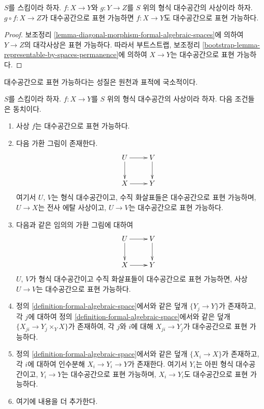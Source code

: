 \begin{lemma}
\label{lemma-permanence-representable}
$S$를 스킴이라 하자. $f : X \to Y$와 $g : Y \to Z$를 $S$ 위의
형식 대수공간의 사상이라 하자. $g \circ f : X \to Z$가 대수공간으로
표현 가능하면 $f : X \to Y$도 대수공간으로 표현 가능하다.
\end{lemma}

\begin{proof}
보조정리 \ref{lemma-diagonal-morphism-formal-algebraic-spaces}에 의하여
$Y \to Z$의 대각사상은 표현 가능하다. 따라서 부트스트랩, 보조정리
\ref{bootstrap-lemma-representable-by-spaces-permanence}에 의하여
$X \to Y$는 대수공간으로 표현 가능하다.
\end{proof}

\noindent
대수공간으로 표현 가능하다는 성질은 원천과 표적에 국소적이다.

\begin{lemma}
\label{lemma-representable-by-algebraic-spaces-local}
$S$를 스킴이라 하자. $f : X \to Y$를 $S$ 위의 형식 대수공간의
사상이라 하자. 다음 조건들은 동치이다.
\begin{enumerate}
\item 사상 $f$는 대수공간으로 표현 가능하다.
\item 다음 가환 그림이 존재한다.
$$
\xymatrix{
U \ar[d] \ar[r] & V \ar[d] \\
X \ar[r] & Y
}
$$
여기서 $U$, $V$는 형식 대수공간이고, 수직 화살표들은 대수공간으로
표현 가능하며, $U \to X$는 전사 에탈 사상이고, $U \to V$는
대수공간으로 표현 가능하다.
\item 다음과 같은 임의의 가환 그림에 대하여
$$
\xymatrix{
U \ar[d] \ar[r] & V \ar[d] \\
X \ar[r] & Y
}
$$
$U$, $V$가 형식 대수공간이고 수직 화살표들이 대수공간으로 표현
가능하면, 사상 $U \to V$는 대수공간으로 표현 가능하다.
\item 정의 \ref{definition-formal-algebraic-space}에서와 같은 덮개
$\{Y_j \to Y\}$가 존재하고, 각 $j$에 대하여 정의
\ref{definition-formal-algebraic-space}에서와 같은 덮개
$\{X_{ji} \to Y_j \times_Y X\}$가 존재하여, 각 $j$와 $i$에 대해
$X_{ji} \to Y_j$가 대수공간으로 표현 가능하다.
\item 정의 \ref{definition-formal-algebraic-space}에서와 같은 덮개
$\{X_i \to X\}$가 존재하고, 각 $i$에 대하여 인수분해
$X_i \to Y_i \to Y$가 존재한다. 여기서 $Y_i$는 아핀 형식
대수공간이고, $Y_i \to Y$는 대수공간으로 표현 가능하며,
$X_i \to Y_i$도 대수공간으로 표현 가능하다.
\item 여기에 내용을 더 추가한다. %
\end{enumerate}
\end{lemma}

